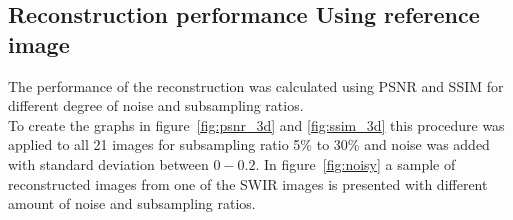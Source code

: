 \subsection{Reconstruction performance Using reference image}
\label{sec:reconstruction_performance}
The performance of the reconstruction was calculated using PSNR and SSIM for different degree of noise and subsampling ratios.\\[0.1in]

To create the graphs in figure~\ref{fig:psnr_3d} and \ref{fig:ssim_3d} this procedure was applied to all 21 images for subsampling ratio 5\% to 30\% and noise was added with standard deviation between $0 - 0.2$. In figure~\ref{fig:noisy} a sample of reconstructed images from one of the SWIR images is presented with different amount of noise and subsampling ratios.


